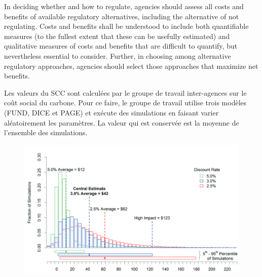 \begin{displayquote}
     In deciding whether and how to regulate, agencies should assess all costs and benefits of available regulatory alternatives, including the alternative of not regulating. Costs and benefits shall be understood to include both quantifiable measures (to the fullest extent that these can be usefully estimated) and qualitative measures of costs and benefits that are difficult to quantify, but nevertheless essential to consider. Further, in choosing among alternative regulatory approaches, agencies should select those approaches that maximize net benefits. 
\end{displayquote}

Les valeurs du SCC sont calculées par le groupe de travail inter-agences sur le coût social du carbone. Pour ce faire, le groupe de travail utilise trois modèles (FUND, DICE et PAGE) et exécute des simulations en faisant varier aléatoirement les paramètres. La valeur qui est conservée est la moyenne de l'ensemble des simulations. 

\begin{figure}
    \centering
    \includegraphics[width=0.9\linewidth]{figures/scc.png}
    \label{fig:scc}
\end{figure}

